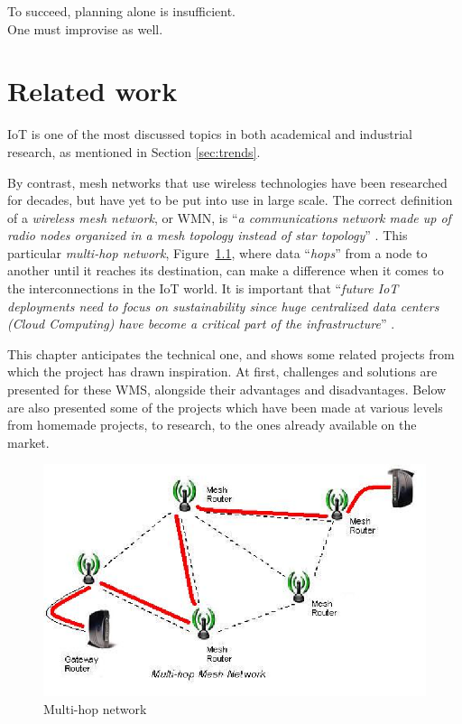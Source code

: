
\begin{savequote}[70mm]
	To succeed, planning alone is insufficient.\\One must improvise as well.
\end{savequote}

\chapter{Related work}\label{chapter:related_work}

	IoT is one of the most discussed topics in both academical and industrial research, as mentioned in Section \ref{sec:trends}.
	
	By contrast, mesh networks that use wireless technologies have been researched for decades, but have yet to be put into use in large scale.
	The correct definition of a \textit{wireless mesh network}, or WMN, is ``\textit{a communications network made up of radio nodes organized in a mesh topology instead of star topology}'' \cite{wms}.	
	This particular \textit{multi-hop network}, Figure~\ref{img:multihop}, where data ``\textit{hops}'' from a node to another until it reaches its destination, can make a difference when it comes to the interconnections in the IoT world.
	It is important that ``\textit{future IoT deployments need to focus on sustainability since huge centralized data centers (Cloud Computing) have become a critical part of the infrastructure}'' \cite{7968828}.
	
	This chapter anticipates the technical one, and shows some related projects from which the project has drawn inspiration.
	At first, challenges and solutions are presented for these WMS, alongside their advantages and disadvantages.
	Below are also presented some of the projects which have been made at various levels from homemade projects, to research, to the ones already available on the market.
	
	\begin{figure}[h]
		\centering
		\includegraphics[width=\textwidth]{resources/img/chap4/mesh}
		\caption{Multi-hop network}
		\label{img:multihop}
	\end{figure}
	
